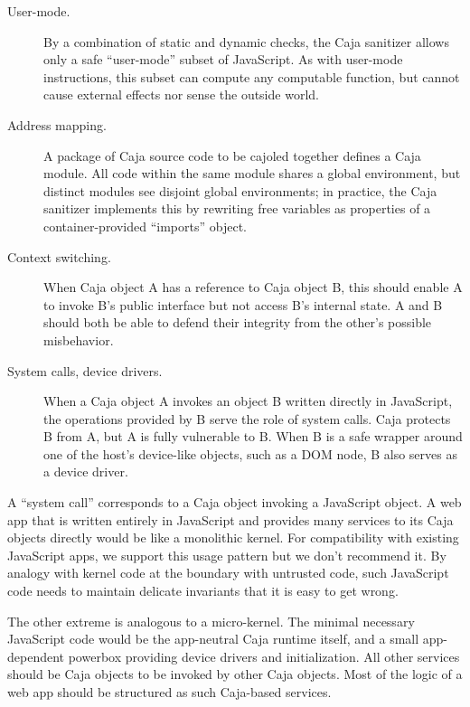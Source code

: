 \documentclass[letterpaper,twocolumn,10pt]{article}
\begin{document}
\begin{description}

  \item[User-mode.] By a combination of static and dynamic checks, the Caja 
  sanitizer allows only a safe ``user-mode'' subset of JavaScript. As with 
  user-mode instructions, this subset can compute any computable function, 
  but cannot cause external effects nor sense the outside world.

  \item[Address mapping.] A package of Caja source code to be cajoled 
  together defines a Caja module. All code within the same module 
  shares a global environment, but distinct modules see disjoint global 
  environments; in practice, the Caja sanitizer implements this by
  rewriting free variables as properties of a container-provided 
  ``imports'' object.

  \item[Context switching.] When Caja object A has a reference to Caja 
  object B, this should enable A to invoke B's public interface but not 
  access B's internal state. A and B should both be able to defend their 
  integrity from the other's possible misbehavior.

  \item[System calls, device drivers.] When a Caja object A invokes an 
  object B written directly in JavaScript, the operations provided by B serve 
  the role of system calls. Caja protects B from A, but A is fully 
  vulnerable to B. When B is a safe wrapper around one of the host's 
  device-like objects, such as a DOM node, B also serves as a device driver.

\end{description}

A ``system call'' corresponds to a Caja object invoking a JavaScript object. 
A web app that is written entirely in JavaScript and provides many services 
to its Caja objects directly would be like a monolithic kernel. For 
compatibility with existing JavaScript apps, we support this usage pattern 
but we don't recommend it. By analogy with kernel code at the boundary with 
untrusted code, such JavaScript code needs to maintain delicate invariants 
that it is easy to get wrong.

The other extreme is analogous to a micro-kernel. The minimal necessary 
JavaScript code would be the app-neutral Caja runtime itself, and a small 
app-dependent powerbox providing device drivers and initialization. All other 
services should be Caja objects to be invoked by other Caja objects. Most 
of the logic of a web app should be structured as such Caja-based services.
\end{document}
